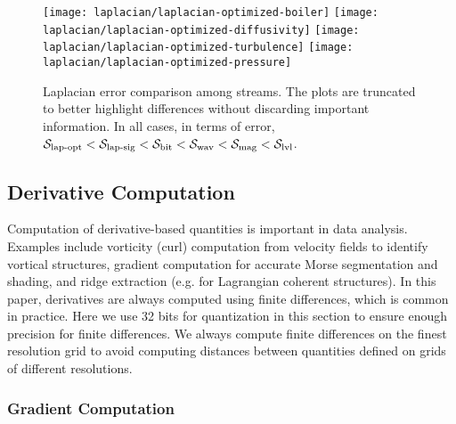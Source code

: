 \begin{figure*}[!t]
\centering
{}
{\texttt{[image: laplacian/laplacian-optimized-boiler]}\vspace{-0.5em}}
{\texttt{[image: laplacian/laplacian-optimized-diffusivity]}\vspace{-0.5em}}
{\texttt{[image: laplacian/laplacian-optimized-turbulence]}\vspace{-0.5em}}
{\texttt{[image: laplacian/laplacian-optimized-pressure]}\vspace{-0.5em}}
\vspace{-0.5em}
\caption{Laplacian error comparison among streams. The plots are truncated to better highlight
differences without discarding important information. In all cases, in terms of error, $\slop <
\slsg < \sbit < \swav < \smag < \slvl$.}
\label{fig:laplacian-error-comparison}
\vspace{-1.5em}
\end{figure*}

\subsection{Derivative Computation} \label{sec:derivatives}

Computation of derivative-based quantities is important in data analysis. Examples include vorticity
(curl) computation from velocity fields to identify vortical structures, gradient computation for
accurate Morse segmentation and shading, and ridge extraction (e.g. for Lagrangian coherent
structures). In this paper, derivatives are always computed using finite differences, which is
common in practice. Here we use 32 bits for quantization in this section to ensure enough precision for
finite differences. We always compute finite differences on the finest resolution grid to avoid
computing distances between quantities defined on grids of different resolutions.

\subsubsection{Gradient Computation} \label{sec:gradient}

